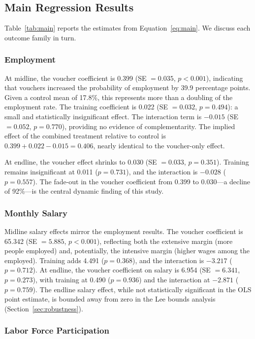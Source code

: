 \documentclass[12pt]{article}
\begin{document}
\subsection{Main Regression Results}

Table~\ref{tab:main} reports the estimates from Equation~\eqref{eq:main}. We discuss each outcome family in turn.

\subsubsection{Employment}

At midline, the voucher coefficient is 0.399 (SE $= 0.035$, $p < 0.001$), indicating that vouchers increased the probability of employment by 39.9 percentage points. Given a control mean of 17.8\%, this represents more than a doubling of the employment rate. The training coefficient is 0.022 (SE $= 0.032$, $p = 0.494$): a small and statistically insignificant effect. The interaction term is $-0.015$ (SE $= 0.052$, $p = 0.770$), providing no evidence of complementarity. The implied effect of the combined treatment relative to control is $0.399 + 0.022 - 0.015 = 0.406$, nearly identical to the voucher-only effect.

At endline, the voucher effect shrinks to 0.030 (SE $= 0.033$, $p = 0.351$). Training remains insignificant at 0.011 ($p = 0.731$), and the interaction is $-0.028$ ($p = 0.557$). The fade-out in the voucher coefficient from 0.399 to 0.030---a decline of 92\%---is the central dynamic finding of this study.

\subsubsection{Monthly Salary}

Midline salary effects mirror the employment results. The voucher coefficient is 65.342 (SE $= 5.885$, $p < 0.001$), reflecting both the extensive margin (more people employed) and, potentially, the intensive margin (higher wages among the employed). Training adds 4.491 ($p = 0.368$), and the interaction is $-3.217$ ($p = 0.712$). At endline, the voucher coefficient on salary is 6.954 (SE $= 6.341$, $p = 0.273$), with training at 0.490 ($p = 0.936$) and the interaction at $-2.871$ ($p = 0.759$). The endline salary effect, while not statistically significant in the OLS point estimate, is bounded away from zero in the Lee bounds analysis (Section~\ref{sec:robustness}).

\subsubsection{Labor Force Participation}
\end{document}
